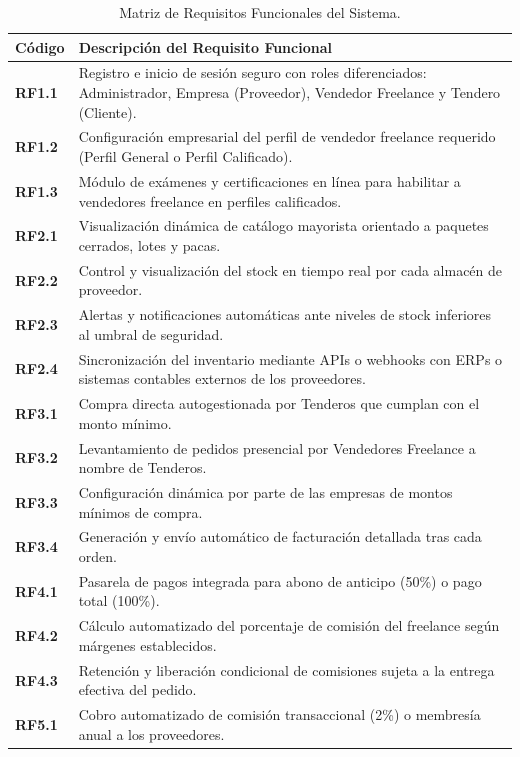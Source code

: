 \documentclass[12pt,spanish,a4paper]{report}
\begin{document}
\begin{table}[h!]
\centering
\small
\begin{tabular}{p{2cm} p{12cm}}
\toprule
\textbf{Código} & \textbf{Descripción del Requisito Funcional} \\
\midrule
\textbf{RF1.1} & Registro e inicio de sesión seguro con roles diferenciados: Administrador, Empresa (Proveedor), Vendedor Freelance y Tendero (Cliente). \\
\textbf{RF1.2} & Configuración empresarial del perfil de vendedor freelance requerido (Perfil General o Perfil Calificado). \\
\textbf{RF1.3} & Módulo de exámenes y certificaciones en línea para habilitar a vendedores freelance en perfiles calificados. \\
\textbf{RF2.1} & Visualización dinámica de catálogo mayorista orientado a paquetes cerrados, lotes y pacas. \\
\textbf{RF2.2} & Control y visualización del stock en tiempo real por cada almacén de proveedor. \\
\textbf{RF2.3} & Alertas y notificaciones automáticas ante niveles de stock inferiores al umbral de seguridad. \\
\textbf{RF2.4} & Sincronización del inventario mediante APIs o webhooks con ERPs o sistemas contables externos de los proveedores. \\
\textbf{RF3.1} & Compra directa autogestionada por Tenderos que cumplan con el monto mínimo. \\
\textbf{RF3.2} & Levantamiento de pedidos presencial por Vendedores Freelance a nombre de Tenderos. \\
\textbf{RF3.3} & Configuración dinámica por parte de las empresas de montos mínimos de compra. \\
\textbf{RF3.4} & Generación y envío automático de facturación detallada tras cada orden. \\
\textbf{RF4.1} & Pasarela de pagos integrada para abono de anticipo (50\%) o pago total (100\%). \\
\textbf{RF4.2} & Cálculo automatizado del porcentaje de comisión del freelance según márgenes establecidos. \\
\textbf{RF4.3} & Retención y liberación condicional de comisiones sujeta a la entrega efectiva del pedido. \\
\textbf{RF5.1} & Cobro automatizado de comisión transaccional (2\%) o membresía anual a los proveedores. \\
\bottomrule
\end{tabular}
\caption{Matriz de Requisitos Funcionales del Sistema.}
\label{tab:rf}
\end{table}
\end{document}

